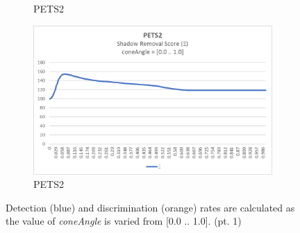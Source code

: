 \begin{appendices}
\begin{figure}
\begin{subfigure}{.45\linewidth}
  \caption{PETS2}
\end{subfigure}
\hfill
\begin{subfigure}{.45\linewidth}
  \includegraphics[width=1\linewidth]{figures/appendix/pets2_coneAngle_score.jpg}
  \caption{PETS2}
\end{subfigure}

\caption{Detection (blue) and discrimination (orange) rates are calculated as the value of \textit{coneAngle} is varied from [0.0 .. 1.0]. (pt. 1)}
\end{figure}


\end{appendices}
